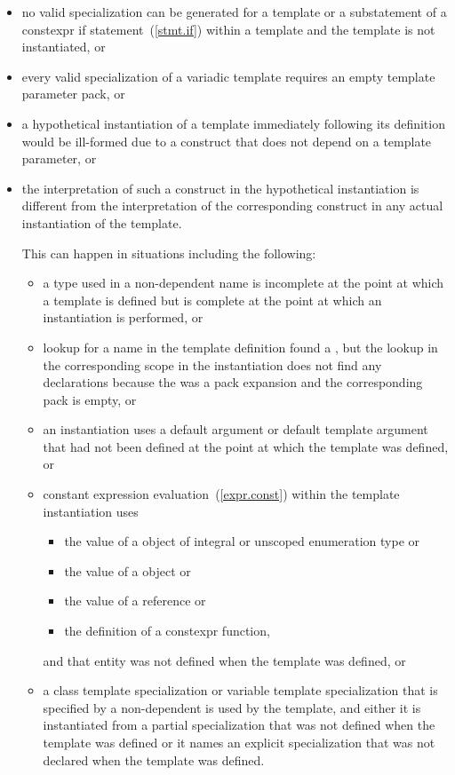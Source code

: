 \begin{itemize}
\item
no valid specialization can be generated for a template
or a substatement of a constexpr if statement~(\ref{stmt.if}) within a template
and the template is not instantiated, or
\item
every valid specialization of a variadic template requires an empty template
parameter pack, or
\item
a hypothetical instantiation of a template
immediately following its definition
would be ill-formed
due to a construct that does not depend on a template parameter, or
\item
the interpretation of such a construct
in the hypothetical instantiation
is different from
the interpretation of the corresponding construct
in any actual instantiation of the template.
\begin{note}
This can happen in situations including the following:
\begin{itemize}
\item a type used in a non-dependent name is incomplete at the point at which a
template is defined but is complete at the point at which an instantiation is
performed, or

\item lookup for a name in the template definition found a ,
but the lookup in the corresponding scope in the instantiation
does not find any declarations because the 
was a pack expansion and the corresponding pack is empty, or

\item an instantiation uses a default argument or default template argument
that had not been defined at the point at which the template was defined, or

\item constant expression evaluation~(\ref{expr.const}) within the template
instantiation uses
  \begin{itemize}
  \item the value of a  object of integral or unscoped enumeration type or
  \item the value of a  object or
  \item the value of a reference or
  \item the definition of a constexpr function,
  \end{itemize}
and that entity was not defined when the template was defined, or

\item a class template specialization or variable template specialization that
is specified by a non-dependent  is used by
the template, and either it is instantiated from a partial specialization that
was not defined when the template was defined or it names an explicit
specialization that was not declared when the template was defined.
\end{itemize}
\end{note}
\end{itemize}

